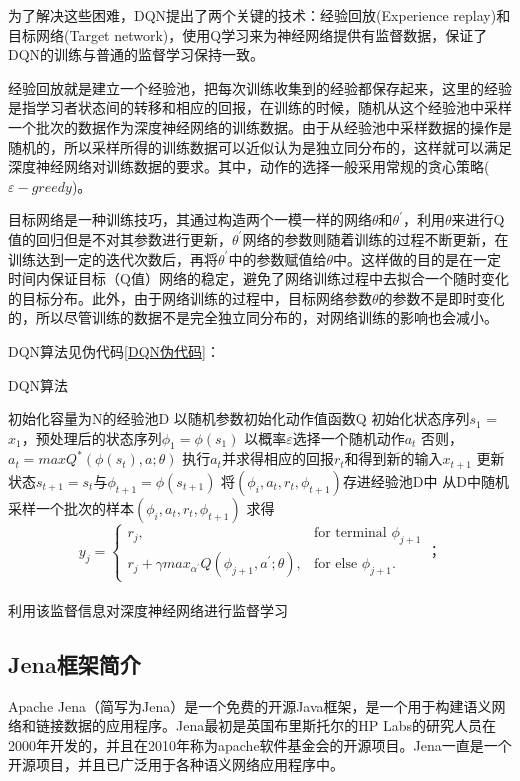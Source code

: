 为了解决这些困难，DQN提出了两个关键的技术：经验回放(Experience replay)和目标网络(Target network)，使用Q学习来为神经网络提供有监督数据，保证了DQN的训练与普通的监督学习保持一致。

经验回放就是建立一个经验池，把每次训练收集到的经验都保存起来，这里的经验是指学习者状态间的转移和相应的回报，在训练的时候，随机从这个经验池中采样一个批次的数据作为深度神经网络的训练数据。由于从经验池中采样数据的操作是随机的，所以采样所得的训练数据可以近似认为是独立同分布的，这样就可以满足深度神经网络对训练数据的要求。其中，动作的选择一般采用常规的贪心策略($\varepsilon-greedy$)。

目标网络是一种训练技巧，其通过构造两个一模一样的网络$\theta$和$\theta^{'}$，利用$\theta$来进行Q值的回归但是不对其参数进行更新，$\theta^{'}$网络的参数则随着训练的过程不断更新，在训练达到一定的迭代次数后，再将$\theta^{'}$中的参数赋值给$\theta$中。这样做的目的是在一定时间内保证目标（Q值）网络的稳定，避免了网络训练过程中去拟合一个随时变化的目标分布。此外，由于网络训练的过程中，目标网络参数$\theta$的参数不是即时变化的，所以尽管训练的数据不是完全独立同分布的，对网络训练的影响也会减小。

DQN算法见伪代码\ref{DQN伪代码}：
\begin{algorithm}
    \caption{DQN算法}
    \label{DQN伪代码}    
    初始化容量为N的经验池D\;
    以随机参数初始化动作值函数Q\;
    {
        初始化状态序列$s_1$ = {$x_1$}，预处理后的状态序列$\phi_1 = \phi(s_1) $\;
        {
            以概率$\varepsilon$选择一个随机动作$a_t$\;
            否则，$a_t = maxQ^*(\phi(s_t),a;\theta)$\;
            执行$a_t$并求得相应的回报$r_t$和得到新的输入$x_{t+1}$\;
            更新状态$s_{t+1}=s_t$与$\phi_{t+1} = \phi(s_{t+1})$\;
            将$(\phi_i,a_t,r_t,\phi_{t+1})$存进经验池D中\;
            从D中随机采样一个批次的样本$(\phi_i,a_t,r_t,\phi_{t+1})$\;
            求得
            \[
                y_j = \begin{cases}
                    r_j,& \text{for terminal }\phi_{j+1}\\
                    r_j+\gamma max_{\alpha^{'}}Q(\phi_{j+1},a^{'};\theta), & \text{for else } \phi_{j+1}.
                \end{cases}；
            \]\\
            利用该监督信息对深度神经网络进行监督学习\;
        }            
    }
\end{algorithm} 

\subsection{Jena框架简介}
Apache Jena（简写为Jena）是一个免费的开源Java框架，是一个用于构建语义网络和链接数据的应用程序。Jena最初是英国布里斯托尔的HP Labs的研究人员在2000年开发的，并且在2010年称为apache软件基金会的开源项目。Jena一直是一个开源项目，并且已广泛用于各种语义网络应用程序中。

